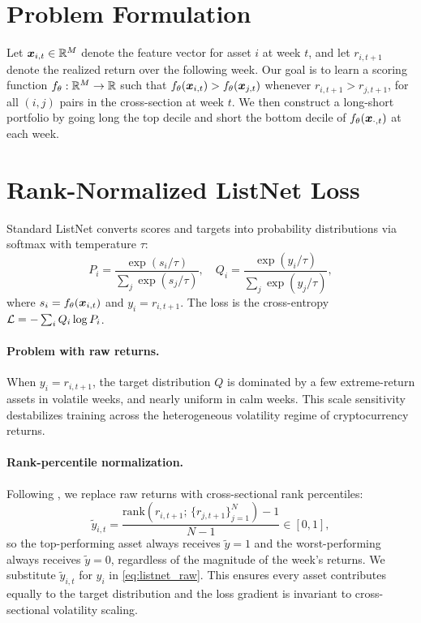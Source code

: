 \section{Problem Formulation}

Let $\bm{x}_{i,t} \in \mathbb{R}^M$ denote the feature vector for asset $i$ at week
$t$, and let $r_{i,t+1}$ denote the realized return over the following
week.
Our goal is to learn a scoring function $f_\theta : \mathbb{R}^M \to \mathbb{R}$ such
that $f_\theta(\bm{x}_{i,t}) > f_\theta(\bm{x}_{j,t})$ whenever
$r_{i,t+1} > r_{j,t+1}$, for all $(i,j)$ pairs in the cross-section
at week $t$.
We then construct a long-short portfolio by going long the top decile
and short the bottom decile of $f_\theta(\bm{x}_{\cdot,t})$ at each week.

\section{Rank-Normalized ListNet Loss}
\label{sec:method:loss}

Standard ListNet \citep{cao2007learning} converts scores and targets into
probability distributions via softmax with temperature $\tau$:
\begin{equation}
  P_i = \frac{\exp(s_i / \tau)}{\sum_j \exp(s_j / \tau)}, \quad
  Q_i = \frac{\exp(y_i / \tau)}{\sum_j \exp(y_j / \tau)},
  \label{eq:listnet_raw}
\end{equation}
where $s_i = f_\theta(\bm{x}_{i,t})$ and $y_i = r_{i,t+1}$.
The loss is the cross-entropy $\mathcal{L} = -\sum_i Q_i \log P_i$.

\paragraph{Problem with raw returns.}
When $y_i = r_{i,t+1}$, the target distribution $Q$ is dominated by a
few extreme-return assets in volatile weeks, and nearly uniform in calm
weeks.
This scale sensitivity destabilizes training across the heterogeneous
volatility regime of cryptocurrency returns.

\paragraph{Rank-percentile normalization.}
Following \citet{poh2021building}, we replace raw returns with
cross-sectional rank percentiles:
\begin{equation}
  \tilde{y}_{i,t} = \frac{\mathrm{rank}(r_{i,t+1};\, \{r_{j,t+1}\}_{j=1}^N) - 1}{N - 1}
  \in [0, 1],
  \label{eq:rank_norm}
\end{equation}
so the top-performing asset always receives $\tilde{y} = 1$ and the
worst-performing always receives $\tilde{y} = 0$, regardless of the
magnitude of the week's returns.
We substitute $\tilde{y}_{i,t}$ for $y_i$ in \cref{eq:listnet_raw}.
This ensures every asset contributes equally to the target distribution
and the loss gradient is invariant to cross-sectional volatility scaling.

